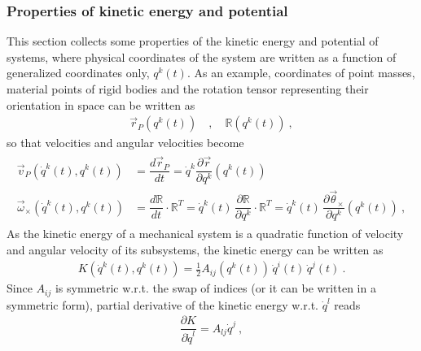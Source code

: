 \documentclass[letterpaper,10pt,english]{jupyterBook}
\begin{document}
\subsubsection{Properties of kinetic energy and potential}
\label{\detokenize{ch/lagrange-t-no:properties-of-kinetic-energy-and-potential}}
\sphinxAtStartPar
This section collects some properties of the kinetic energy and potential of systems, where physical coordinates of the system are written as a function of generalized coordinates only, \(q^k(t)\). As an example, coordinates of point masses, material points of rigid bodies and the rotation tensor representing their orientation in space can be written as
\begin{equation*}
\begin{split}\vec{r}_P\left(q^k(t)\right) \quad , \quad \mathbb{R} \left( q^k(t) \right) \ ,\end{split}
\end{equation*}
\sphinxAtStartPar
so that velocities and angular velocities become
\begin{equation*}
\begin{split}\begin{aligned}
  \vec{v}_P\left(\dot{q}^k(t), q^k(t)\right) & = \dfrac{d \vec{r}_P}{dt} = \dot{q}^k \dfrac{\partial \vec{r}}{\partial q^k}\left(q^k(t)\right) \\ 
  \vec{\omega}_{\times}\left(\dot{q}^k(t), q^k(t)\right) & = \dfrac{d \mathbb{R}}{d t} \cdot \mathbb{R}^T = \dot{q}^k(t) \, \dfrac{\partial \mathbb{R}}{\partial q^k} \cdot \mathbb{R}^T = \dot{q}^k(t) \, \dfrac{\partial \vec{\theta}_{\times}}{\partial q^k}\left(q^k(t)\right) \ ,
\end{aligned}\end{split}
\end{equation*}
\sphinxAtStartPar
As the kinetic energy of a mechanical system is a quadratic function of velocity and angular velocity of its sub\sphinxhyphen{}systems, the kinetic energy can be written as
\begin{equation*}
\begin{split}K\left( \dot{q}^k(t), q^k(t) \right) = \frac{1}{2} A_{ij}\left(q^k(t)\right) \, \dot{q}^i(t) \, \dot{q}^j(t) \ .\end{split}
\end{equation*}
\sphinxAtStartPar
Since \(A_{ij}\) is symmetric w.r.t. the swap of indices (or it can be written in a symmetric form), partial derivative of the kinetic energy w.r.t. \(\dot{q}^l\) reads
\begin{equation*}
\begin{split}\dfrac{\partial K}{\partial \dot{q}^l} = A_{lj} \dot{q}^j \ ,\end{split}
\end{equation*}
\end{document}
